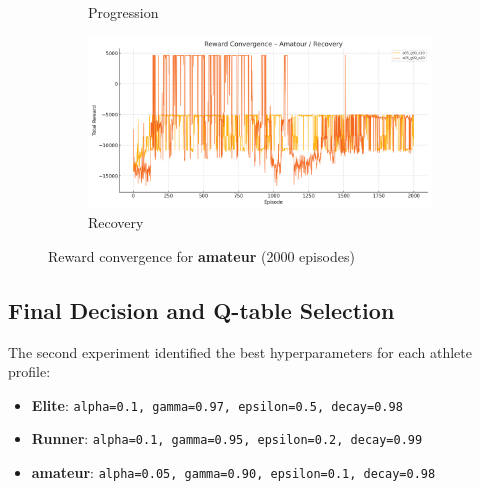 \begin{figure}[htbp]
\begin{subfigure}[b]{0.45\textwidth}
    \caption{Progression}
  \end{subfigure}
  \hfill
  \begin{subfigure}[b]{0.45\textwidth}
    \includegraphics[width=\textwidth]{images/amatour_recovery_convergence.png}
    \caption{Recovery}
  \end{subfigure}
  \caption{Reward convergence for \textbf{amateur} (2000 episodes)}
  \label{fig:amateur_convergence}
\end{figure}


\subsection{Final Decision and Q-table Selection}

The second experiment identified the best hyperparameters for each athlete profile:

\begin{itemize}
    \item \textbf{Elite}:   \texttt{alpha=0.1, gamma=0.97, epsilon=0.5, decay=0.98}
    \item \textbf{Runner}:  \texttt{alpha=0.1, gamma=0.95, epsilon=0.2, decay=0.99}
    \item \textbf{amateur}: \texttt{alpha=0.05, gamma=0.90, epsilon=0.1, decay=0.98}
\end{itemize}
